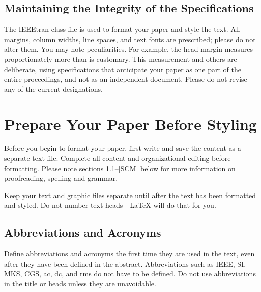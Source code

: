 \documentclass[journal]{IEEEtran} %
\begin{document}
\subsection{Maintaining the Integrity of the Specifications}

The IEEEtran class file is used to format your paper and style the text. All margins,
column widths, line spaces, and text fonts are prescribed; please do not
alter them. You may note peculiarities. For example, the head margin
measures proportionately more than is customary. This measurement
and others are deliberate, using specifications that anticipate your paper
as one part of the entire proceedings, and not as an independent document.
Please do not revise any of the current designations.

\section{Prepare Your Paper Before Styling}
Before you begin to format your paper, first write and save the content as a
separate text file. Complete all content and organizational editing before
formatting. Please note sections \ref{AA}--\ref{SCM} below for more information on
proofreading, spelling and grammar.

Keep your text and graphic files separate until after the text has been
formatted and styled. Do not number text heads---{\LaTeX} will do that
for you.

\subsection{Abbreviations and Acronyms}\label{AA}
Define abbreviations and acronyms the first time they are used in the text,
even after they have been defined in the abstract. Abbreviations such as
IEEE, SI, MKS, CGS, ac, dc, and rms do not have to be defined. Do not use
abbreviations in the title or heads unless they are unavoidable.
\end{document}

